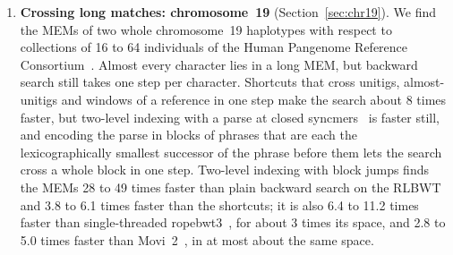 \begin{enumerate}
\item \textbf{Crossing long matches: chromosome~19} (Section~\ref{sec:chr19}).
We find the MEMs of two whole chromosome~19 haplotypes with respect to collections of 16 to 64 individuals of the Human Pangenome Reference Consortium~\cite{HPRC2025,LucasEtAl2026}.
Almost every character lies in a long MEM, but backward search still takes one step per character.
Shortcuts that cross unitigs, almost-unitigs and windows of a reference in one step make the search about 8 times faster, but two-level indexing with a parse at closed syncmers~\cite{Edgar2021} is faster still, and encoding the parse in blocks of phrases that are each the lexicographically smallest successor of the phrase before them lets the search cross a whole block in one step.
Two-level indexing with block jumps finds the MEMs 28 to 49 times faster than plain backward search on the RLBWT and 3.8 to 6.1 times faster than the shortcuts; it is also 6.4 to 11.2 times faster than single-threaded ropebwt3~\cite{Li2024}, for about 3 times its space, and 2.8 to 5.0 times faster than Movi~2~\cite{ZakeriEtAl2026}, in at most about the same space.
\end{enumerate}

